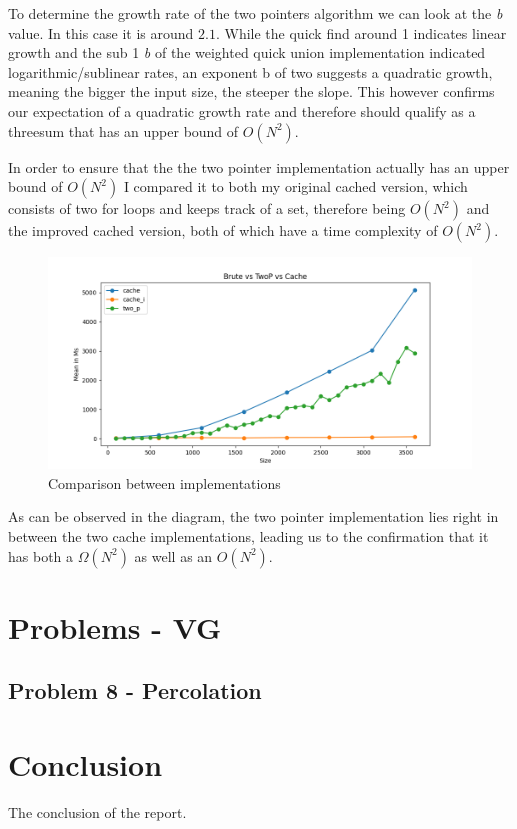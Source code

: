 \documentclass[12pt]{article}
\begin{document}
To determine the growth rate of the two pointers algorithm we can look at the \emph{b} value.
In this case it is around \emph{$2.1$}. While the quick find around 1 indicates linear growth and the 
sub 1 \emph{b} of the weighted quick union implementation indicated logarithmic/sublinear rates, an exponent b
of two suggests a quadratic growth, meaning the bigger the input size, the steeper the slope.
This however confirms our expectation of a quadratic growth rate and therefore should qualify
as a threesum that has an upper bound of $O(N^2)$.

In order to ensure that the the two pointer implementation actually has an upper bound of $O(N^2)$
I compared it to both my original cached version, which consists of two for loops and keeps track of a set, 
therefore being $O(N^2)$ and the improved cached version, both of which have a time complexity of $O(N^2)$.

\begin{figure}[h]
        \includegraphics[width=0.9\linewidth]{images/comparison.png}
        \caption{Comparison between implementations}
        \label{fig:image1}
\end{figure}

As can be observed in the diagram, the two pointer implementation lies right in between the two cache implementations,
leading us to the confirmation that it has both a $\Omega{(N^2)}$ as well as an $O{(N^2)}$.

\pagebreak

\section{Problems - VG}

\subsection{Problem 8 - Percolation}

\section{Conclusion}
The conclusion of the report.
\end{document}
